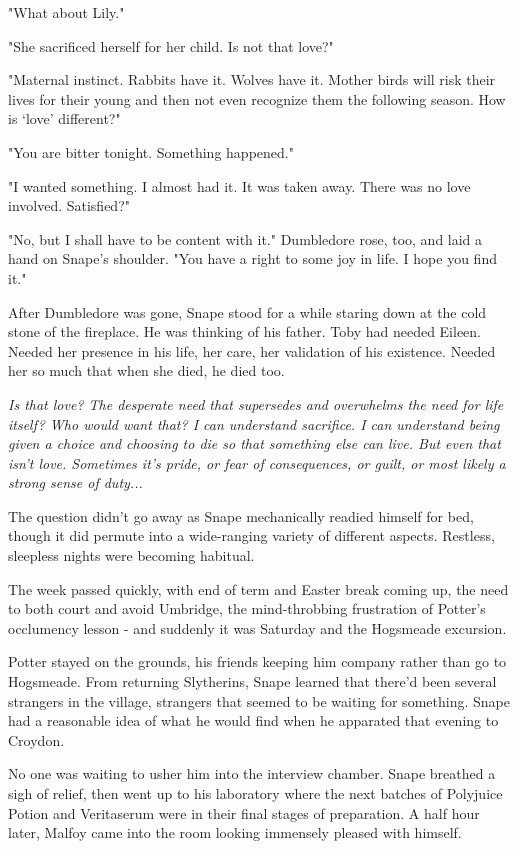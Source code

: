 \documentclass[a4paper,11pt]{article}
\begin{document}
"What about Lily."

"She sacrificed herself for her child. Is not that love?"

"Maternal instinct. Rabbits have it. Wolves have it. Mother birds will risk their lives for their young and then not even recognize them the following season. How is `love' different?"

"You are bitter tonight. Something happened."

"I wanted something. I almost had it. It was taken away. There was no love involved. Satisfied?"

"No, but I shall have to be content with it." Dumbledore rose, too, and laid a hand on Snape's shoulder. "You have a right to some joy in life. I hope you find it."

After Dumbledore was gone, Snape stood for a while staring down at the cold stone of the fireplace. He was thinking of his father. Toby had needed Eileen. Needed her presence in his life, her care, her validation of his existence. Needed her so much that when she died, he died too.

\emph{Is that love? The desperate need that supersedes and overwhelms the need for life itself? Who would want that? I can understand sacrifice. I can understand being given a choice and choosing to die so that something else can live. But even that isn't love. Sometimes it's pride, or fear of consequences, or guilt, or most likely a strong sense of duty...}

The question didn't go away as Snape mechanically readied himself for bed, though it did permute into a wide-ranging variety of different aspects. Restless, sleepless nights were becoming habitual.

The week passed quickly, with end of term and Easter break coming up, the need to both court and avoid Umbridge, the mind-throbbing frustration of Potter's occlumency lesson - and suddenly it was Saturday and the Hogsmeade excursion.

Potter stayed on the grounds, his friends keeping him company rather than go to Hogsmeade. From returning Slytherins, Snape learned that there'd been several strangers in the village, strangers that seemed to be waiting for something. Snape had a reasonable idea of what he would find when he apparated that evening to Croydon.

No one was waiting to usher him into the interview chamber. Snape breathed a sigh of relief, then went up to his laboratory where the next batches of Polyjuice Potion and Veritaserum were in their final stages of preparation. A half hour later, Malfoy came into the room looking immensely pleased with himself.
\end{document}
